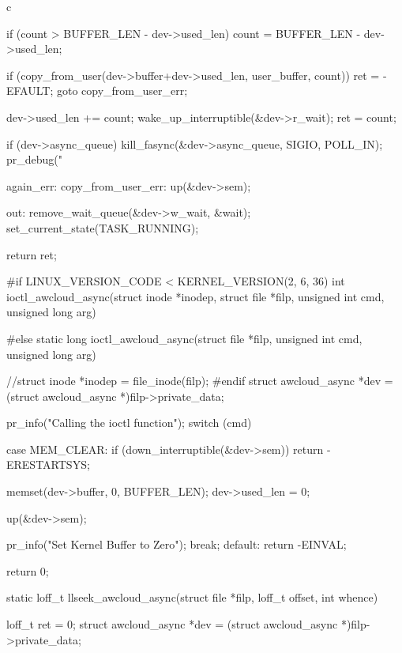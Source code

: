 \begin{code-block}{c}
{        if (count > BUFFER_LEN - dev->used_len) {
                count = BUFFER_LEN - dev->used_len;
        }

        if (copy_from_user(dev->buffer+dev->used_len, user_buffer, count)) {
                ret = -EFAULT;
                goto copy_from_user_err;
        }

        dev->used_len += count;
        wake_up_interruptible(&dev->r_wait);
        ret = count;

        if (dev->async_queue) {
                kill_fasync(&dev->async_queue, SIGIO, POLL_IN);
                pr_debug("%
        }

again_err:
copy_from_user_err:
        up(&dev->sem);

out:
        remove_wait_queue(&dev->w_wait, &wait);
        set_current_state(TASK_RUNNING);

        return ret;
}

#if LINUX_VERSION_CODE < KERNEL_VERSION(2, 6, 36)
int ioctl_awcloud_async(struct inode *inodep,
        struct file *filp, unsigned int cmd, unsigned long arg)
{
#else
static long ioctl_awcloud_async(struct file *filp,
        unsigned int cmd, unsigned long arg)
{
        //struct inode *inodep = file_inode(filp);
#endif
        struct awcloud_async *dev = (struct awcloud_async *)filp->private_data;

        pr_info("Calling the ioctl function\n");
        switch (cmd) {
        case MEM_CLEAR:
                if (down_interruptible(&dev->sem)) {
                        return -ERESTARTSYS;
                }

                memset(dev->buffer, 0, BUFFER_LEN);
                dev->used_len = 0;

                up(&dev->sem);

                pr_info("Set Kernel Buffer to Zero\n");
                break;
        default:
                return -EINVAL;
        }
        return 0;
}

static loff_t llseek_awcloud_async(struct file *filp,
        loff_t offset, int whence)
{
        loff_t ret = 0;
        struct awcloud_async *dev = (struct awcloud_async *)filp->private_data;

}}
\end{code-block}
